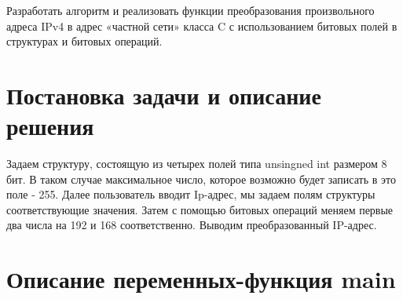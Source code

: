 \documentclass[a4paper,12pt]{report}
\begin{document}
Разработать алгоритм и реализовать функции преобразования произвольного адреса IPv4 в адрес «частной сети» класса C с использованием битовых полей в структурах и битовых операций.

\section*{Постановка задачи и описание решения}
\par

Задаем структуру, состоящую из четырех полей типа unsingned int размером 8 бит. В таком случае максимальное число, которое возможно будет записать в это поле - 255. Далее пользователь вводит Ip-адрес, мы задаем полям структуры соответствующие значения. Затем с помощью битовых операций меняем первые два числа на 192 и 168 соответственно. Выводим преобразованный IP-адрес.
\section*{Описание переменных-функция main}
\begin{centering}
\end{centering}
\end{document}
